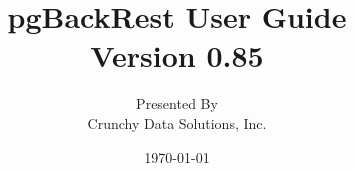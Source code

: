 \documentclass[titlepage,letterpaper,12pt]{article}
\begin{document}
\title{pgBackRest User Guide\\
       Version 0.85}
\author{Presented By\\
        Crunchy Data Solutions, Inc.}
\date{\today}
\maketitle

\renewcommand\contentsname{Table of Contents}
\tableofcontents
\newpage

%
%
%
%
%
%
%
%
%

\end{document}
